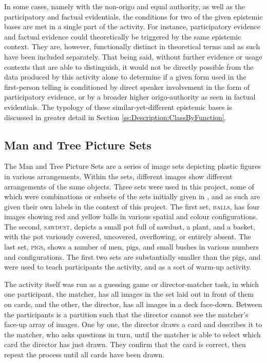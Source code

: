 In some cases, namely with the non-origo and equal authority, as well as the participatory and factual evidentials, the conditions for two of the given epistemic bases are met in a single part of the activity. For instance, participatory evidence and factual evidence could theoretically be triggered by the same epistemic context. They are, however, functionally distinct in theoretical terms and as such have been included separately. That being said, without further evidence or usage contexts that are able to distinguish, it would not be directly possible from the data produced by this activity alone to determine if a given form used in the first-person telling is conditioned by direct speaker involvement in the form of participatory evidence, or by a broader higher origo-authority as seen in factual evidentials. The typology of these similar-yet-different epistemic bases is discussed in greater detail in Section \ref{ss:Description:ClassByFunction}.

\subsection{Man and Tree Picture Sets}
The Man and Tree Picture Sets \cite{Levinson1992} are a series of image sets depicting plastic figures in various arrangements. Within the sets, different images show different arrangements of the same objects. Three sets were used in this project, some of which were combinations or subsets of the sets initially given in , and as such are given their own labels in the context of this project. The first set, \textsc{balls}, has four images showing red and yellow balls in various spatial and colour configurations. The second, \textsc{sawdust}, depicts a small pot full of sawdust, a plant, and a basket, with the pot variously covered, uncovered, overflowing, or entirely absent. The last set, \textsc{pigs}, shows a number of men, pigs, and small bushes in various numbers and configurations. The first two sets are substantially smaller than the {pigs}, and were used to teach participants the activity, and as a sort of warm-up activity.

The activity itself was run as a guessing game or director-matcher task, in which one participant, the matcher, has all images in the set laid out in front of them on cards, and the other, the director, has all images in a deck face-down. Between the participants is a partition such that the director cannot see the matcher's face-up array of images. One by one, the director draws a card and describes it to the matcher, who asks questions in turn, until the matcher is able to select which card the director has just drawn. They confirm that the card is correct, then repeat the process until all cards have been drawn.

